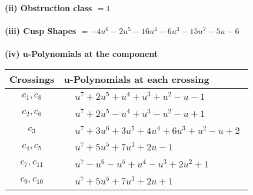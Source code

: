 \documentclass[1p]{elsarticle_modified}
\theoremstyle{definition}
\begin{document}
\flushleft \textbf{(ii) Obstruction class $= 1$}\\~\\
\flushleft \textbf{(iii) Cusp Shapes $= -4 u^6-2 u^5-16 u^4-6 u^3-15 u^2-5 u-6$}\\~\\
\newpage\renewcommand{\arraystretch}{1}
\flushleft \textbf{(iv) u-Polynomials at the component}\newline \\
\begin{tabular}{m{50pt}|m{274pt}}
Crossings & \hspace{64pt}u-Polynomials at each crossing \\
\hline $$\begin{aligned}c_{1},c_{8}\end{aligned}$$&$\begin{aligned}
&u^7+2 u^5+u^4+u^3+u^2- u-1
\end{aligned}$\\
\hline $$\begin{aligned}c_{2},c_{6}\end{aligned}$$&$\begin{aligned}
&u^7+2 u^5- u^4+u^3- u^2- u+1
\end{aligned}$\\
\hline $$\begin{aligned}c_{3}\end{aligned}$$&$\begin{aligned}
&u^7+3 u^6+3 u^5+4 u^4+6 u^3+u^2- u+2
\end{aligned}$\\
\hline $$\begin{aligned}c_{4},c_{5}\end{aligned}$$&$\begin{aligned}
&u^7+5 u^5+7 u^3+2 u-1
\end{aligned}$\\
\hline $$\begin{aligned}c_{7},c_{11}\end{aligned}$$&$\begin{aligned}
&u^7- u^6- u^5+u^4- u^3+2 u^2+1
\end{aligned}$\\
\hline $$\begin{aligned}c_{9},c_{10}\end{aligned}$$&$\begin{aligned}
&u^7+5 u^5+7 u^3+2 u+1
\end{aligned}$\\
\hline
\end{tabular}\\~\\
\end{document}

